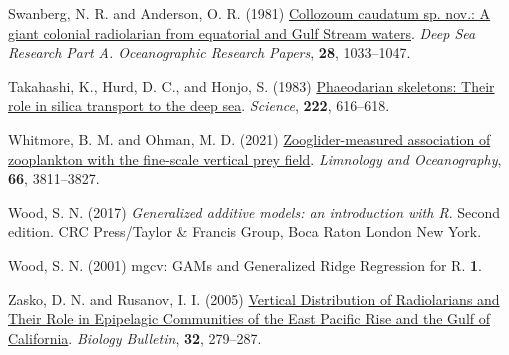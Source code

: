 \documentclass[
]{article}
\newlength{\cslhangindent}
\newenvironment{CSLReferences}[2] %
 {\begin{list}{}{%
  \setlength{\itemindent}{0pt}
  \setlength{\leftmargin}{0pt}
  \setlength{\parsep}{0pt}
  \ifodd #1
   \setlength{\leftmargin}{\cslhangindent}
   \setlength{\itemindent}{-1\cslhangindent}
  \fi
  \setlength{\itemsep}{#2\baselineskip}}}
 {\end{list}}
\begin{document}
\begin{CSLReferences}{1}{0}
Swanberg, N. R. and Anderson, O. R. (1981)
\href{https://doi.org/10.1016/0198-0149(81)90016-9}{Collozoum caudatum
sp. nov.: A giant colonial radiolarian from equatorial and Gulf Stream
waters}. \emph{Deep Sea Research Part A. Oceanographic Research Papers},
\textbf{28}, 1033--1047.

Takahashi, K., Hurd, D. C., and Honjo, S. (1983)
\href{https://doi.org/10.1126/science.222.4624.616}{Phaeodarian
skeletons: Their role in silica transport to the deep sea}.
\emph{Science}, \textbf{222}, 616--618.

Whitmore, B. M. and Ohman, M. D. (2021)
\href{https://doi.org/10.1002/lno.11920}{Zooglider-measured association
of zooplankton with the fine-scale vertical prey field}. \emph{Limnology
and Oceanography}, \textbf{66}, 3811--3827.

Wood, S. N. (2017) \emph{Generalized additive models: an introduction
with R}. Second edition. CRC Press/Taylor \& Francis Group, Boca Raton
London New York.

Wood, S. N. (2001) mgcv: GAMs and Generalized Ridge Regression for R.
\textbf{1}.

Zasko, D. N. and Rusanov, I. I. (2005)
\href{https://doi.org/10.1007/s10525-005-0103-5}{Vertical Distribution
of Radiolarians and Their Role in Epipelagic Communities of the East
Pacific Rise and the Gulf of California}. \emph{Biology Bulletin},
\textbf{32}, 279--287.

\end{CSLReferences}
\end{document}
